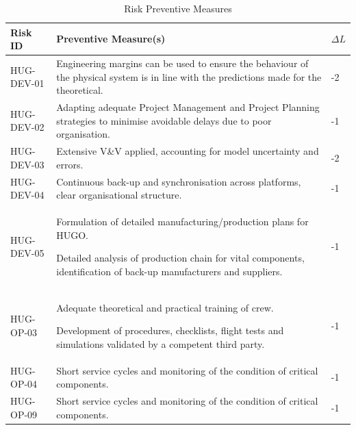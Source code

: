 \begin{table}[H]
   \caption{Risk Preventive Measures}
    \centering
    \begin{tabular}{|p{2.5cm}|p{11cm}|p{0.75cm}|}
    \hline
        \textbf{ Risk ID} & \textbf{Preventive Measure(s)} & \textbf{$\Delta L$}  \\ \hline\hline
         HUG-DEV-01 &  Engineering margins can be used to ensure the behaviour of the physical system is in line with the predictions made for the theoretical. & -2  \\ \hline
         HUG-DEV-02 & Adapting adequate Project Management and Project Planning strategies to minimise avoidable delays due to poor organisation. & -1  \\ \hline
         HUG-DEV-03 & Extensive V\&V applied, accounting for model uncertainty and errors. & -2  \\ \hline
         HUG-DEV-04 & Continuous back-up and synchronisation across platforms, clear organisational structure. & -1  \\ \hline
         HUG-DEV-05 & Formulation of detailed manufacturing/production plans for HUGO.
         
         Detailed analysis of production chain for vital components, identification of back-up manufacturers and suppliers. & -1 \\ \hline
         HUG-OP-03 & Adequate theoretical and practical training of crew.
         
         Development of procedures, checklists, flight tests and simulations validated by a competent third party. & -1 \\ \hline
         HUG-OP-04 & Short service cycles and monitoring of the condition of critical components. & -1 \\ \hline
         HUG-OP-09 & Short service cycles and monitoring of the condition of critical components. & -1 \\ \hline


         
         
    \end{tabular}
    \label{tab:risk_preventive_measures}
\end{table}


